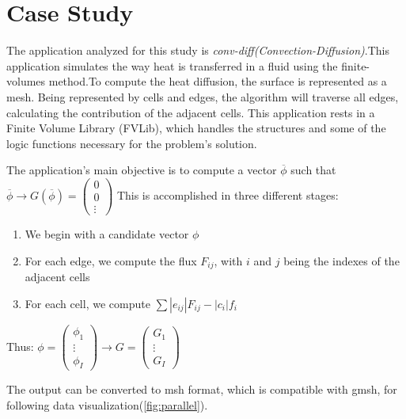 \documentclass[a4paper,10pt,openright,openbib,twocolumn]{article}
\begin{document}
\section{Case Study}
\label{case}
The application analyzed for this study is \emph{conv-diff(Convection-Diffusion)}.This application simulates the way heat is transferred in a fluid using the finite-volumes method.To compute the heat diffusion, the surface is represented as a mesh. Being represented by cells and edges, the algorithm will traverse all edges, calculating the contribution of the adjacent cells. This application rests in a Finite Volume Library (FVLib), which handles the structures and some of the logic functions necessary for the problem's solution.

The application's main objective is to compute a vector $\overline{\phi}$ such that $\overline{\phi} \longrightarrow G(\overline{\phi}) = \left(\begin{array}{c}
0\\
0\\
\vdots\end{array}\right)$
This is accomplished in three different stages:
\begin{enumerate}
    \item {We begin with a candidate vector $\phi$}
    \item {For each edge, we compute the flux $F_{ij}$, with $i$ and $j$ being the indexes of the adjacent cells}
    \item {For each cell, we compute $\sum |e_{ij}| F_{ij} - |c_i| f_i$}
\end{enumerate}
Thus: $\phi = \left(\begin{array}{c}
\phi_1\\
\vdots\\
\phi_I
\end{array}\right) \longrightarrow G = \left(\begin{array}{c}
G_1\\
\vdots\\
G_I
\end{array}\right)$


The output can be converted to msh format, which is compatible with gmsh, for following data visualization(\cref{fig:parallel}).
\end{document}
